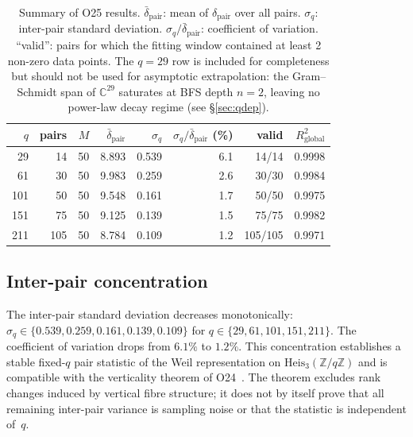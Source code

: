 \documentclass[11pt,a4paper]{article}
\theoremstyle{definition}
\newcommand{\dpair}{\delta_{\mathrm{pair}}}
\newcommand{\dpairmean}{\bar{\delta}_{\mathrm{pair}}}
\newcommand{\Heis}{\mathrm{Heis}_3(\mathbb{Z}/q\mathbb{Z})}
\begin{document}
      \begin{table}[h]
        \centering
        \begin{tabular}{rrrrrrrr}
          \toprule
          $q$ & pairs & $M$ & $\dpairmean$ & $\sigma_q$ & $\sigma_q/\dpairmean$ (\%)
          & valid & $R^2_{\mathrm{global}}$ \\
          \midrule
          29  & 14  & 50 & 8.893 & 0.539 & 6.1 & 14/14   & 0.9998 \\
          61  & 30  & 50 & 9.983 & 0.259 & 2.6 & 30/30   & 0.9984 \\
          101 & 50  & 50 & 9.548 & 0.161 & 1.7 & 50/50   & 0.9975 \\
          151 & 75  & 50 & 9.125 & 0.139 & 1.5 & 75/75   & 0.9982 \\
          211 & 105 & 50 & 8.784 & 0.109 & 1.2 & 105/105 & 0.9971 \\
          \bottomrule
        \end{tabular}
        \caption{Summary of O25 results.
          $\dpairmean$: mean of $\dpair$ over all pairs.
          $\sigma_q$: inter-pair standard deviation.
          $\sigma_q/\dpairmean$: coefficient of variation.
          ``valid'': pairs for which the fitting window contained at least 2
          non-zero data points.
          The $q = 29$ row is included for completeness but should not be used
          for asymptotic extrapolation: the Gram--Schmidt span of $\mathbb{C}^{29}$
          saturates at BFS depth $n = 2$, leaving no power-law decay regime
          (see \S\ref{sec:qdep}).}
        \label{tab:results}
      \end{table}

    \subsection{Inter-pair concentration}
      \label{ssec:concentration}

      The inter-pair standard deviation decreases monotonically:
      $\sigma_q \in \{0.539, 0.259, 0.161, 0.139, 0.109\}$ for
      $q \in \{29, 61, 101, 151, 211\}$.
      The coefficient of variation drops from $6.1\%$ to $1.2\%$.
      This concentration establishes a stable fixed-$q$ pair statistic of the
      Weil representation on $\Heis$ and is compatible with the verticality theorem of
      O24~\cite{Beau2026a28}.  The theorem excludes rank changes induced by vertical fibre
      structure; it does not by itself prove that all remaining inter-pair variance is sampling
      noise or that the statistic is independent of~$q$.
\end{document}
